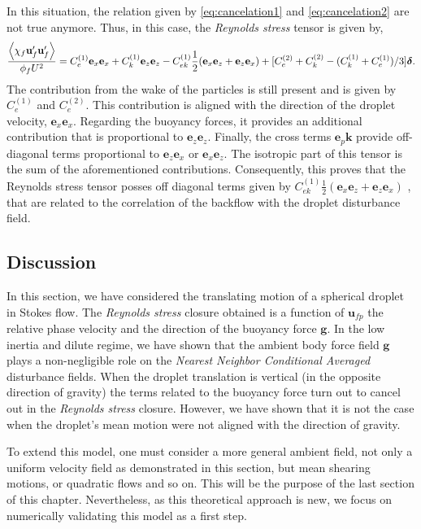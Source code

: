 In this situation, the relation given by \ref{eq:cancelation1} and \ref{eq:cancelation2} are not true anymore. 
Thus, in this case, the \textit{Reynolds stress} tensor is given by, 
\begin{equation}
    \frac{\left<\chi_f \textbf{u}_f'\textbf{u}_f'\right>}{\phi_f U^2}
    = 
    C^{(1)}_e 
    \textbf{e}_x\textbf{e}_x
    +C^{(1)}_k    
    \textbf{e}_z\textbf{e}_z
    - C^{(1)}_{ek} 
        \frac{1}{2}
        (\textbf{e}_x\textbf{e}_z+ \textbf{e}_z \textbf{e}_x)
    + [C^{(2)}_e + C^{(2)}_k - (C^{(1)}_k + C^{(1)}_e )/3 ]  \bm\delta. 
\end{equation}
The contribution from the wake of the particles is still present and is given by $C_e^{(1)}$ and $C_e^{(2)}$. 
This contribution is aligned with the direction of the droplet velocity, $\textbf{e}_x\textbf{e}_x$. 
Regarding the buoyancy forces, it provides an additional contribution that is proportional to $\textbf{e}_z\textbf{e}_z$. 
Finally, the cross terms $\textbf{e}_p \textbf{k}$ provide off-diagonal terms proportional to $\textbf{e}_z \textbf{e}_x$ or $\textbf{e}_x \textbf{e}_z$. 
The isotropic part of this tensor is the sum of the aforementioned contributions. 
Consequently, this proves that the Reynolds stress tensor posses off diagonal terms given by $C^{(1)}_{ek} 
\frac{1}{2} (\textbf{e}_x\textbf{e}_z+ \textbf{e}_z \textbf{e}_x)$ , that are related to the correlation of the backflow with the droplet disturbance field. 

\subsection{Discussion}

In this section, we have considered the translating motion of a spherical droplet in Stokes flow. 
The \textit{Reynolds stress} closure obtained is a function of $\textbf{u}_{fp}$ the relative phase velocity and the direction of the buoyancy force $\textbf{g}$. 
In the low inertia and dilute regime, we have shown that the ambient body force field $\textbf{g}$ plays a non-negligible role on the \textit{Nearest Neighbor Conditional Averaged} disturbance fields.
When the droplet translation is vertical (in the opposite direction of gravity) the terms related to the buoyancy force turn out to cancel out in the \textit{Reynolds stress} closure.
However, we have shown that it is not the case when the droplet's mean motion were not aligned with the direction of gravity.  

To extend this model, one must consider a more general ambient field, not only a uniform velocity field as demonstrated in this section, but mean shearing motions, or quadratic flows and so on. 
This will be the purpose of the last section of this chapter. 
Nevertheless, as this theoretical approach is new, we focus on numerically validating this model as a first step. 
